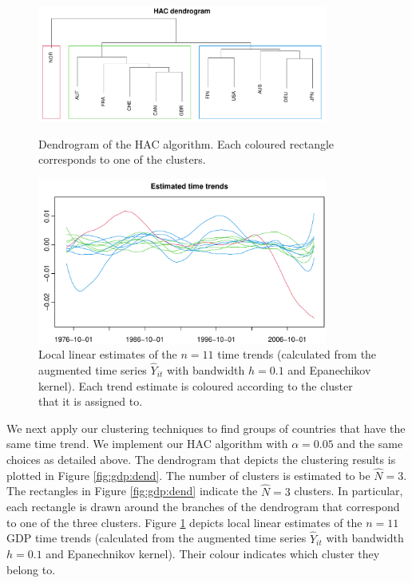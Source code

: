 \documentclass[a4paper,12pt]{article}
\begin{document}
\begin{figure}[t!]
\begin{center}
\includegraphics[width=0.85\textwidth]{output/plots/gdp/dendrogram}
\caption{Dendrogram of the HAC algorithm. Each coloured rectangle corresponds to one of the clusters.}\label{fig:gdp:dend}

\includegraphics[width=0.85\textwidth]{output/plots/gdp/all_clusters}
\caption{Local linear estimates of the $n=11$ time trends (calculated from the augmented time series $\widehat{Y}_{it}$ with bandwidth $h = 0.1$ and Epanechikov kernel). Each trend estimate is coloured according to the cluster that it is assigned to. }\label{fig:gdp:all_clusters}
\end{center}
\end{figure}



We next apply our clustering techniques to find groups of countries that have the same time trend. We implement our HAC algorithm with $\alpha = 0.05$ and the same choices as detailed above. 
The dendrogram that depicts the clustering results is plotted in Figure \ref{fig:gdp:dend}. The number of clusters is estimated to be $\widehat{N} = 3$. The rectangles in Figure \ref{fig:gdp:dend} indicate the $\widehat{N} = 3$ clusters. In particular, each rectangle is drawn around the branches of the dendrogram that correspond to one of the three clusters. Figure \ref{fig:gdp:all_clusters} depicts local linear estimates of the $n=11$ GDP time trends (calculated from the augmented time series $\widehat{Y}_{it}$ with bandwidth $h = 0.1$ and Epanechnikov kernel). Their colour indicates which cluster they belong to. 
\end{document}
